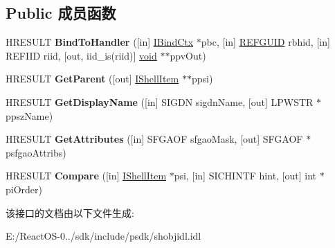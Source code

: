 \subsection*{Public 成员函数}
\begin{DoxyCompactItemize}
\item 
\mbox{\label{interface_i_shell_item_a441005279bd86e6881b185ae2874ea9a}} 
H\+R\+E\+S\+U\+LT {\bfseries Bind\+To\+Handler} (\mbox{[}in\mbox{]} \hyperlink{interface_i_bind_ctx}{I\+Bind\+Ctx} $\ast$pbc, \mbox{[}in\mbox{]} \hyperlink{struct___g_u_i_d}{R\+E\+F\+G\+U\+ID} rbhid, \mbox{[}in\mbox{]} R\+E\+F\+I\+ID riid, \mbox{[}out, iid\+\_\+is(riid)\mbox{]} \hyperlink{interfacevoid}{void} $\ast$$\ast$ppv\+Out)
\item 
\mbox{\label{interface_i_shell_item_a96d1640296f8dc673a4c65f65a983309}} 
H\+R\+E\+S\+U\+LT {\bfseries Get\+Parent} (\mbox{[}out\mbox{]} \hyperlink{interface_i_shell_item}{I\+Shell\+Item} $\ast$$\ast$ppsi)
\item 
\mbox{\label{interface_i_shell_item_a207a15e991213a59c9621016f457b521}} 
H\+R\+E\+S\+U\+LT {\bfseries Get\+Display\+Name} (\mbox{[}in\mbox{]} S\+I\+G\+DN sigdn\+Name, \mbox{[}out\mbox{]} L\+P\+W\+S\+TR $\ast$ppsz\+Name)
\item 
\mbox{\label{interface_i_shell_item_a74299750e1ea45fe0d145bc4186a458e}} 
H\+R\+E\+S\+U\+LT {\bfseries Get\+Attributes} (\mbox{[}in\mbox{]} S\+F\+G\+A\+OF sfgao\+Mask, \mbox{[}out\mbox{]} S\+F\+G\+A\+OF $\ast$psfgao\+Attribs)
\item 
\mbox{\label{interface_i_shell_item_a98c64517fce3b75b1bf98c35c03d7141}} 
H\+R\+E\+S\+U\+LT {\bfseries Compare} (\mbox{[}in\mbox{]} \hyperlink{interface_i_shell_item}{I\+Shell\+Item} $\ast$psi, \mbox{[}in\mbox{]} S\+I\+C\+H\+I\+N\+TF hint, \mbox{[}out\mbox{]} int $\ast$pi\+Order)
\end{DoxyCompactItemize}


该接口的文档由以下文件生成\+:\begin{DoxyCompactItemize}
\item 
E\+:/\+React\+O\+S-\/0../sdk/include/psdk/shobjidl.\+idl\end{DoxyCompactItemize}
